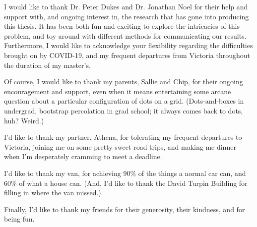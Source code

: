 \documentclass[12pt,oneside]{sigmasthesis}
\theoremstyle{definition}
\begin{document}
\newpage{}\tableofcontents %
\newpage{}\listoftables %
\newpage{}\listoffigures %

\begin{acknowledgements} 
	\baselineskip
I would like to thank Dr. Peter Dukes and Dr. Jonathan Noel for their help and support with, and ongoing interest in, the research that has gone into producing this thesis. It has been both fun and exciting to explore the intricacies of this problem, and toy around with different methods for communicating our results. Furthermore, I would like to acknowledge your flexibility regarding the difficulties brought on by COVID-19, and my frequent departures from Victoria throughout the duration of my master's. 

Of course, I would like to thank my parents, Sallie and Chip, for their ongoing encouragement and support, even when it means entertaining some arcane question about a particular configuration of dots on a grid. (Dots-and-boxes in undergrad, bootstrap percolation in grad school; it always comes back to dots, huh? Weird.) 

I'd like to thank my partner, Athena, for tolerating my frequent departures to Victoria, joining me on some pretty sweet road trips, and making me dinner when I'm desperately cramming to meet a deadline.

I'd like to thank my van, for achieving 90\% of the things a normal car can, and 60\% of what a house can. (And, I'd like to thank the David Turpin Building for filling in where the van missed.) 

Finally, I'd like to thank my friends for their generosity, their kindness, and for being fun.
\end{acknowledgements}
\end{document}
